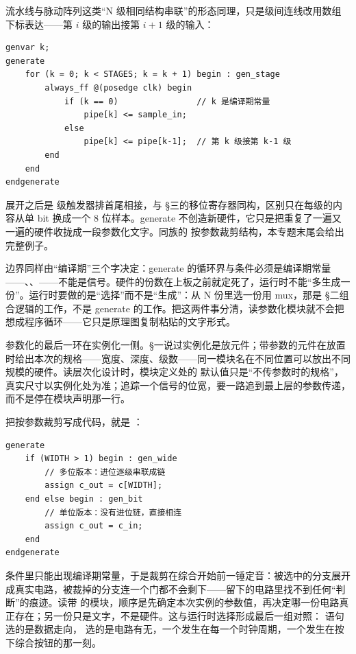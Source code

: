 流水线与脉动阵列这类“N 级相同结构串联”的形态同理，只是级间连线改用数组下标表达——第 $i$ 级的输出接第 $i+1$ 级的输入：

\begin{lstlisting}
genvar k;
generate
    for (k = 0; k < STAGES; k = k + 1) begin : gen_stage
        always_ff @(posedge clk) begin
            if (k == 0)                // k 是编译期常量
                pipe[k] <= sample_in;
            else
                pipe[k] <= pipe[k-1];  // 第 k 级接第 k-1 级
        end
    end
endgenerate
\end{lstlisting}

展开之后是  级触发器排首尾相接，与 §三的移位寄存器同构，区别只在每级的内容从单 bit 换成一个 8 位样本。generate 不创造新硬件，它只是把重复了一遍又一遍的硬件收拢成一段参数化文字。同族的  按参数裁剪结构，本专题末尾会给出完整例子。

边界同样由“编译期”三个字决定：generate 的循环界与条件必须是编译期常量——、、——不能是信号。硬件的份数在上板之前就定死了，运行时不能“多生成一份”。运行时要做的是“选择”而不是“生成”：从 N 份里选一份用 mux，那是 §二组合逻辑的工作，不是 generate 的工作。把这两件事分清，读参数化模块就不会把  想成程序循环——它只是原理图复制粘贴的文字形式。

参数化的最后一环在实例化一侧。§一说过实例化是放元件；带参数的元件在放置时给出本次的规格——宽度、深度、级数——同一模块名在不同位置可以放出不同规模的硬件。读层次化设计时，模块定义处的  默认值只是“不传参数时的规格”，真实尺寸以实例化处为准；追踪一个信号的位宽，要一路追到最上层的参数传递，而不是停在模块声明那一行。

把按参数裁剪写成代码，就是 ：

\begin{lstlisting}
generate
    if (WIDTH > 1) begin : gen_wide
        // 多位版本：进位逐级串联成链
        assign c_out = c[WIDTH];
    end else begin : gen_bit
        // 单位版本：没有进位链，直接相连
        assign c_out = c_in;
    end
endgenerate
\end{lstlisting}

条件里只能出现编译期常量，于是裁剪在综合开始前一锤定音：被选中的分支展开成真实电路，被裁掉的分支连一个门都不会剩下——留下的电路里找不到任何“判断”的痕迹。读带  的模块，顺序是先确定本次实例的参数值，再决定哪一份电路真正存在；另一份只是文字，不是硬件。这与运行时选择形成最后一组对照： 语句选的是数据走向， 选的是电路有无，一个发生在每一个时钟周期，一个发生在按下综合按钮的那一刻。

